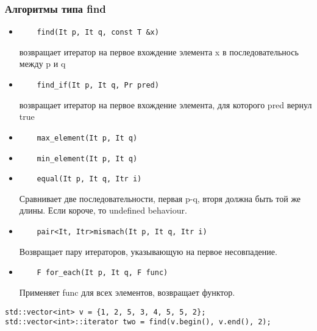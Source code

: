 \subsubsection{Алгоритмы типа find}
\begin{itemize}[noitemsep]
\item 
	\begin{verbatim}
	find(It p, It q, const T &x)
	\end{verbatim} 
	возвращает итератор на первое вхождение элемента x в последовательнось между p и q
\item 
	\begin{verbatim}
	find_if(It p, It q, Pr pred)
	\end{verbatim} 
	возвращает итератор на первое вхождение элемента, для которого pred вернул true
\item 
	\begin{verbatim}
	max_element(It p, It q)
	\end{verbatim} 
\item 
	\begin{verbatim}
	min_element(It p, It q)
	\end{verbatim} 
\item 
	\begin{verbatim}
	equal(It p, It q, Itr i)
	\end{verbatim} 
	Сравнивает две последовательности, первая p-q, вторя должна быть той же длины. Если короче, то undefined behaviour.
\item 
	\begin{verbatim}
	pair<It, Itr>mismach(It p, It q, Itr i)
	\end{verbatim} 
	Возвращает пару итераторов, указывающую на первое несовпадение.
\item 
	\begin{verbatim}
	F for_each(It p, It q, F func)
	\end{verbatim} 
	Применяет func для всех элементов, возвращает функтор.
\end{itemize}
\begin{verbatim}
std::vector<int> v = {1, 2, 5, 3, 4, 5, 5, 2};
std::vector<int>::iterator two = find(v.begin(), v.end(), 2);
\end{verbatim}
